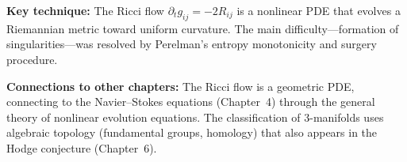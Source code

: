 \noindent\textbf{Key technique:} The Ricci flow $\partial_t g_{ij} = -2R_{ij}$ is a nonlinear PDE that evolves a Riemannian metric toward uniform curvature. The main difficulty---formation of singularities---was resolved by Perelman's entropy monotonicity and surgery procedure.

\noindent\textbf{Connections to other chapters:} The Ricci flow is a geometric PDE, connecting to the Navier--Stokes equations (Chapter~4) through the general theory of nonlinear evolution equations. The classification of 3-manifolds uses algebraic topology (fundamental groups, homology) that also appears in the Hodge conjecture (Chapter~6).